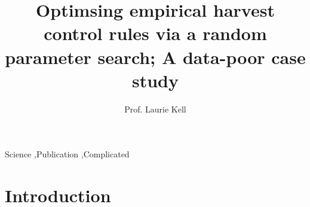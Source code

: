 \documentclass[preprint,review,12pt]{elsarticle}
\begin{document}
\begin{frontmatter}


\title{Optimsing empirical harvest control rules via a random parameter search; A data-poor case study}




\author{Prof. Laurie Kell}

\address{Henstead, UK}

\begin{abstract}

\end{abstract}

\begin{keyword}
Science \sep Publication \sep Complicated


\end{keyword}

\end{frontmatter}

\linenumbers

\section{Introduction}
\label{S:1}
\end{document}
